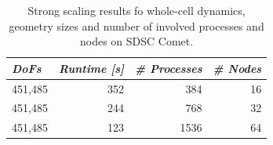 \begin{center}
\begin{table}[H]
\centering
\begin{tabular}{lrrr} 
\toprule
\emph{DoFs} & \emph{Runtime [s]} & \emph{\# Processes} & \emph{\# Nodes}\\
\midrule 
451,485 & 352 & 384 & 16 \\
451,485 & 244 & 768 & 32 \\
451,485 & 123 & 1536 & 64 \\
\bottomrule
\end{tabular}
\caption{Strong scaling results fo whole-cell dynamics, geometry sizes
and number of involved processes and nodes on SDSC Comet.}
\label{tab:speedup_whole_cell_strong}
\end{table}
\end{center}

